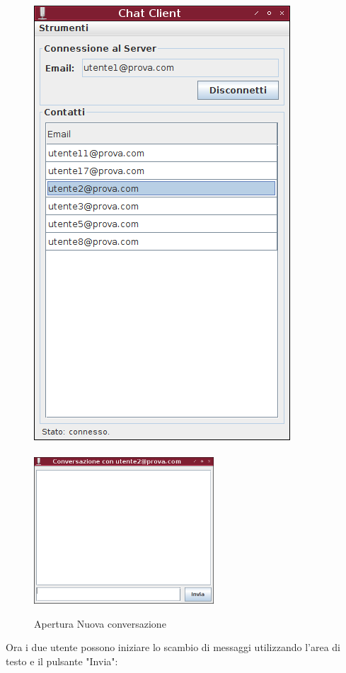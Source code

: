 \documentclass[a4paper, 11pt]{article} %
\begin{document}
\begin{figure}[H]
\includegraphics[height=0.9\textwidth]{images/client-4.png}
\\
\\
\includegraphics[width=0.6\textwidth]{images/client-5.png}
\vspace{-0.2cm}
\caption{Apertura Nuova conversazione}
\end{figure}
\clearpage
Ora i due utente possono iniziare lo scambio di messaggi utilizzando l'area di testo e il pulsante "Invia":
\end{document}
